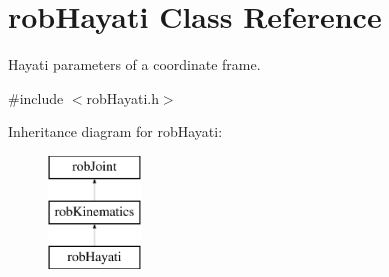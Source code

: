 \hypertarget{classrob_hayati}{}\section{rob\+Hayati Class Reference}
\label{classrob_hayati}


Hayati parameters of a coordinate frame.  




{\ttfamily \#include $<$rob\+Hayati.\+h$>$}

Inheritance diagram for rob\+Hayati\+:\begin{figure}[H]
\begin{center}
\leavevmode
\includegraphics[height=3.000000cm]{d8/da9/classrob_hayati}
\end{center}
\end{figure}
